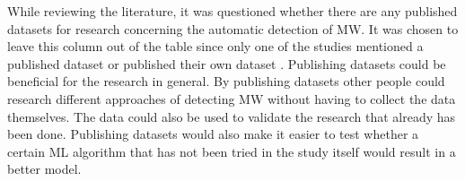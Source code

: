 While reviewing the literature, it was questioned whether there are any published datasets for research concerning the automatic detection of MW. It was chosen to leave this column out of the table since only one of the studies mentioned a published dataset or published their own dataset \cite{Zhao2017ScalableApproach}. Publishing datasets could be beneficial for the research in general. By publishing datasets other people could research different approaches of detecting MW without having to collect the data themselves. The data could also be used to validate the research that already has been done. Publishing datasets would also make it easier to test whether a certain ML algorithm that has not been tried in the study itself would result in a better model.